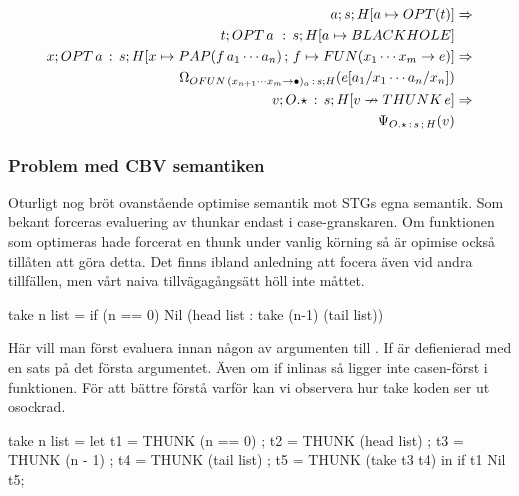 \documentclass[../Optimise]{subfiles}
\begin{document}
\begin{align*}
a;s;H[a\mapsto OPT(t)] & \Rightarrow\\
t;OPT\,a\,\,:\,s;H[a\mapsto BLACKHOLE]\\
x;OPT\,a\,:\,s;H[x\mapsto PAP(f\,a_{1}\cdots a_{n})\,;\,f\mapsto FUN(x_{1}\cdots x_{m}\to e)] & \Rightarrow\\
\Omega_{OFUN\,(x_{n+1}\cdots x_{m}\to\bullet)_{a}\,:\,s;H}(e[a_{1}/x_{1}\cdots a_{n}/x_{n}])\\
v;O.\star\,:\, s;H[v\nrightarrow THUNK\,e] & \Rightarrow\\
\Psi_{O.\star\,:\, s\,;\,H}(v)
\end{align*}



\subsubsection{Problem med CBV semantiken}

Oturligt nog bröt ovanstående optimise semantik mot STGs egna semantik. 
Som bekant forceras evaluering av thunkar endast i case-granskaren. 
Om funktionen som optimeras hade forcerat en thunk under vanlig körning så är
 opimise också tillåten att göra detta. Det finns ibland anledning att focera
 även vid andra tillfällen, men vårt naiva tillvägagångsätt höll inte måttet.

\begin{codeEx}
take n list = if (n == 0) Nil (head list : take (n-1) (tail list))
\end{codeEx}
Här vill man först evaluera  innan någon av argumenten till .
If är defienierad med en  sats på det första argumentet. Även om
if inlinas så ligger inte casen-först i funktionen. För att bättre förstå varför kan vi observera hur take koden ser ut osockrad. 

\begin{codeEx}
take n list = let 
    { t1 = THUNK (n == 0)
    ; t2 = THUNK (head list)
    ; t3 = THUNK (n - 1)
    ; t4 = THUNK (tail list)
    ; t5 = THUNK (take t3 t4)
    } in  if t1 Nil t5;
\end{codeEx}
\end{document}
